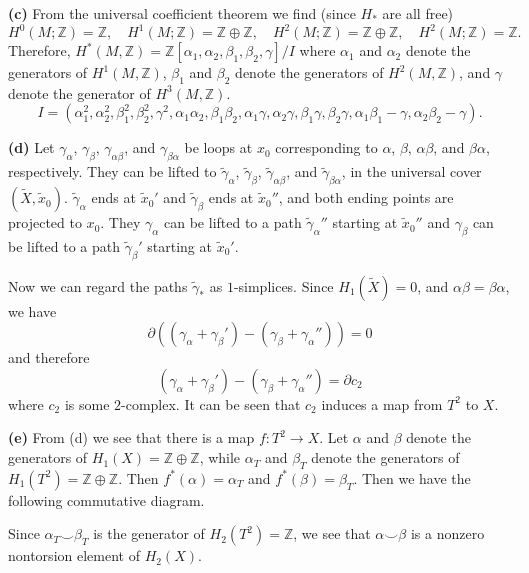 \documentclass{article}
\makeatletter
\newcommand*{\shifttext}[1]{%
  \settowidth{\@tempdima}{#1}%
  \hspace{-\@tempdima}#1%
}
\newcommand{\plabel}[1]{%
\shifttext{\textbf{#1}\quad}%
}
\makeatother
\begin{document}
\plabel{(c)}%
From the universal coefficient theorem we find (since $H_*$ are all free)
\[ H^0(M;\mathbb{Z}) = \mathbb{Z},\quad H^1(M;\mathbb{Z}) = \mathbb{Z} \oplus \mathbb{Z},\quad H^2(M;\mathbb{Z}) = \mathbb{Z} \oplus \mathbb{Z},\quad H^2(M;\mathbb{Z}) = \mathbb{Z}. \]
Therefore, $H^*(M,\mathbb{Z}) = \mathbb{Z}[\alpha_1,\alpha_2,\beta_1,\beta_2,\gamma]/I$ where $\alpha_1$ and $\alpha_2$ denote the generators of $H^1(M,\mathbb{Z})$, $\beta_1$ and $\beta_2$ denote the generators of $H^2(M,\mathbb{Z})$, and $\gamma$ denote the generator of $H^3(M,\mathbb{Z})$.
\[ I = (\alpha_1^2,\alpha_2^2,\beta_1^2,\beta_2^2,\gamma^2,\alpha_1\alpha_2,\beta_1\beta_2,\alpha_1\gamma,\alpha_2\gamma,\beta_1\gamma,\beta_2\gamma,\alpha_1\beta_1-\gamma,\alpha_2\beta_2-\gamma). \]

\plabel{(d)}%
Let $\gamma_\alpha$, $\gamma_\beta$, $\gamma_{\alpha\beta}$, and $\gamma_{\beta\alpha}$ be loops at $x_0$ corresponding to $\alpha$, $\beta$, $\alpha\beta$, and $\beta\alpha$, respectively.
They can be lifted to $\tilde{\gamma}_\alpha$, $\tilde{\gamma}_\beta$, $\tilde{\gamma}_{\alpha\beta}$, and $\tilde{\gamma}_{\beta\alpha}$, in the universal cover $(\tilde{X},\tilde{x}_0)$.
$\tilde{\gamma}_\alpha$ ends at $\tilde{x}_{0}'$ and $\tilde{\gamma}_\beta$ ends at $\tilde{x}_{0}''$, and both ending points are projected to $x_0$.
They $\gamma_\alpha$ can be lifted to a path $\tilde{\gamma}_\alpha''$ starting at $\tilde{x}_0''$ and $\gamma_\beta$ can be lifted to a path $\tilde{\gamma}_\beta'$ starting at $\tilde{x}_0'$.
\par
Now we can regard the paths $\tilde{\gamma}_*$ as $1$-simplices.
Since $H_1(\tilde{X}) = 0$, and $\alpha\beta = \beta\alpha$, we have
\[ \partial((\gamma_\alpha + \gamma_\beta') - (\gamma_\beta + \gamma_\alpha'')) = 0 \]
and therefore
\[ (\gamma_\alpha + \gamma_\beta') - (\gamma_\beta + \gamma_\alpha'') = \partial c_2 \]
where $c_2$ is some $2$-complex.
It can be seen that $c_2$ induces a map from $T^2$ to $X$.

\plabel{(e)}%
From (d) we see that there is a map $f:T^2 \rightarrow X$.
Let $\alpha$ and $\beta$ denote the generators of $H_1(X) = \mathbb{Z}\oplus\mathbb{Z}$, while $\alpha_T$ and $\beta_T$ denote the generators of $H_1(T^2) = \mathbb{Z}\oplus\mathbb{Z}$.
Then $f^*(\alpha) = \alpha_T$ and $f^*(\beta) = \beta_T$.
Then we have the following commutative diagram.
\begin{center}
\end{center}
Since $\alpha_T \smile \beta_T$ is the generator of $H_2(T^2) = \mathbb{Z}$, we see that $\alpha\smile \beta$ is a nonzero nontorsion element of $H_2(X)$.
\end{document}
